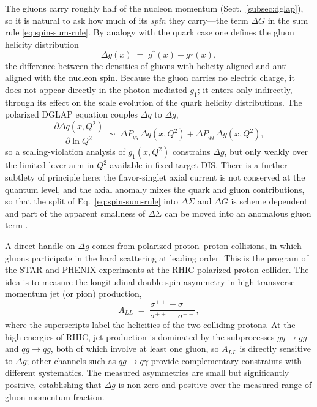 The gluons carry roughly half of the nucleon momentum (Sect.~\ref{subsec:dglap}), so it
is natural to ask how much of its \emph{spin} they carry---the term $\Delta G$ in the sum
rule \eqref{eq:spin-sum-rule}. By analogy with the quark case one defines the gluon
helicity distribution
\begin{equation}
    \Delta g(x) \;=\; g^{\uparrow}(x) - g^{\downarrow}(x),
    \label{eq:delta-g}
\end{equation}
the difference between the densities of gluons with helicity aligned and anti-aligned
with the nucleon spin. Because the gluon carries no electric charge, it does not appear
directly in the photon-mediated $g_{1}$; it enters only indirectly, through its effect on
the scale evolution of the quark helicity distributions. The polarized DGLAP equation
couples $\Delta q$ to $\Delta g$,
\begin{equation}
    \frac{\partial\Delta q(x,Q^{2})}{\partial\ln Q^{2}}
    \;\sim\; \Delta P_{qq}\,\Delta q(x,Q^{2}) + \Delta P_{qg}\,\Delta g(x,Q^{2}),
    \label{eq:polarized-dglap}
\end{equation}
so a scaling-violation analysis of $g_{1}(x,Q^{2})$ constrains $\Delta g$, but only
weakly over the limited lever arm in $Q^{2}$ available in fixed-target DIS. There is a
further subtlety of principle here: the flavor-singlet axial current is not conserved at
the quantum level, and the axial anomaly mixes the quark and gluon contributions, so that
the split of Eq.~\eqref{eq:spin-sum-rule} into $\Delta\Sigma$ and $\Delta G$ is
scheme dependent and part of the apparent smallness of $\Delta\Sigma$ can be moved into
an anomalous gluon term \cite[Ch.~4.6]{ThomasWeise2001}.

A direct handle on $\Delta g$ comes from polarized proton--proton collisions, in which
gluons participate in the hard scattering at leading order. This is the program of the
STAR and PHENIX experiments at the RHIC polarized proton collider. The idea is to measure
the longitudinal double-spin asymmetry in high-transverse-momentum jet (or pion)
production,
\begin{equation}
    A_{LL} \;=\; \frac{\sigma^{++} - \sigma^{+-}}{\sigma^{++} + \sigma^{+-}},
    \label{eq:ALL-rhic}
\end{equation}
where the superscripts label the helicities of the two colliding protons. At the high
energies of RHIC, jet production is dominated by the subprocesses $gg\to gg$ and
$qg\to qg$, both of which involve at least one gluon, so $A_{LL}$ is directly sensitive
to $\Delta g$; other channels such as $qg\to q\gamma$ provide complementary constraints
with different systematics. The measured asymmetries are small but significantly
positive, establishing that $\Delta g$ is non-zero and positive over the measured range
of gluon momentum fraction.

